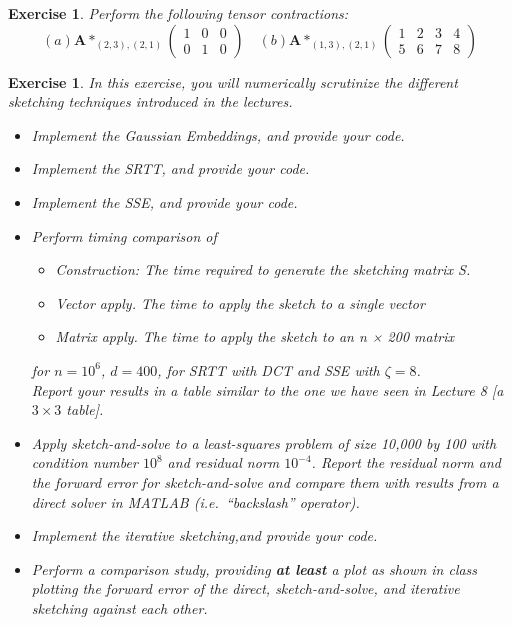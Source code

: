 \documentclass[11pt]{article}
\newcommand{\bvec}[1]{\mathbf{#1}}
\newcommand{\vA}{\bvec{A}}
\newtheorem{exercise}[theorem]{Exercise}
\begin{document}
\begin{exercise}
Perform the following tensor contractions:
$$
(a) \vA *_{(2,3),(2,1)} 
\begin{pmatrix}
1 & 0 & 0\\
0 & 1 & 0
\end{pmatrix}
\quad 
(b) \vA *_{(1,3),(2,1)} 
\begin{pmatrix}
1&     2&     3&     4\\
5&     6&     7&     8
\end{pmatrix}
$$
\end{exercise}

\begin{exercise}
In this exercise, you will numerically scrutinize the different sketching techniques introduced in the lectures.
\begin{itemize}
\item[a)] Implement the Gaussian Embeddings, and provide your code.\vspace{-3mm}
\item[b)] Implement the SRTT, and provide your code.\vspace{-3mm}
\item[c)] Implement the SSE, and provide your code.\vspace{-3mm}
\item[d)] Perform timing comparison of\vspace{-3mm}
\begin{itemize}
    \item[$\bullet$] Construction: The time required to generate the sketching matrix S. \vspace{-2mm}
    \item[$\bullet$] Vector apply. The time to apply the sketch to a single vector\vspace{-2mm}
    \item[$\bullet$] Matrix apply. The time to apply the sketch to an n × 200 matrix\vspace{-2mm}
\end{itemize}
for $n=10^6$, $d=400$, for SRTT with DCT and SSE with $\zeta=8$.\\ 
Report your results in a table similar to the one we have seen in Lecture 8 [a $3\times 3$ table].\vspace{-3mm}
\item[e)] Apply sketch-and-solve to a least-squares problem of size 10,000 by 100 with condition number $10^8$ and residual norm $10^{-4}$.
Report the residual norm and the forward error for sketch-and-solve and compare them with results from a direct solver in MATLAB (i.e.~``backslash'' operator).\vspace{-3mm}
\item[f)] Implement the iterative sketching,and provide your code.\vspace{-3mm} 
\item[g)] Perform a comparison study, providing {\bf at least} a plot as shown in class plotting the forward error of the direct, sketch-and-solve, and iterative sketching against each other.
\end{itemize}

\end{exercise}
\end{document}
